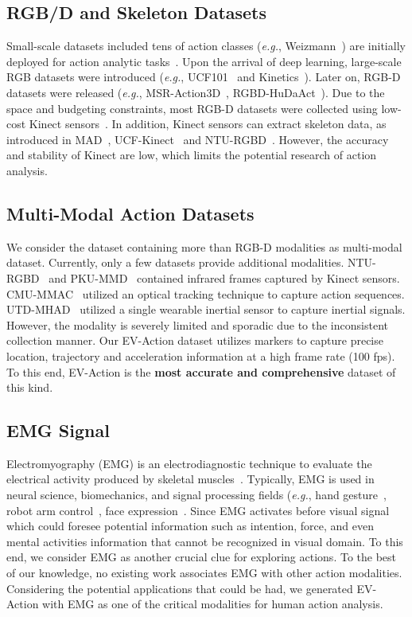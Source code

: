 \documentclass[a4paper, 10pt, conference]{ieeeconf}      \usepackage{FG2020}
\newcommand*\eg{\textit{e.g.}}
\begin{document}
\subsection{RGB/D and Skeleton Datasets}
Small-scale datasets included tens of action classes (\eg, Weizmann~\cite{weiz_dataset}) are initially deployed for  action analytic tasks~\cite{RGBD_Survey}. Upon the arrival of deep learning, large-scale RGB datasets were introduced (\eg, UCF101~\cite{RGB_UCF101} and Kinetics~\cite{RGB_kinetics}). Later on, RGB-D datasets were released (\eg, MSR-Action3D~\cite{MSRAction3D}, RGBD-HuDaAct~\cite{RGBD_data2}). Due to the space and budgeting constraints, most RGB-D datasets were collected using low-cost Kinect sensors~\cite{kinect_v1v2,kinect_book}. In addition, Kinect sensors can extract skeleton data, as introduced in MAD~\cite{MAD1}, UCF-Kinect~\cite{SK_data_UCF} and NTU-RGBD~\cite{SK_data_UTN}. However, the accuracy and stability of Kinect are low, which limits the potential research of action analysis.

\subsection{Multi-Modal Action Datasets}
We consider the dataset containing more than RGB-D modalities as multi-modal dataset. Currently, only a few datasets provide additional modalities. NTU-RGBD~\cite{SK_data_UTN} and PKU-MMD~\cite{PKU_MMD} contained infrared frames captured by Kinect sensors. CMU-MMAC~\cite{Multi_data_CMU} utilized an optical tracking technique to capture action sequences. UTD-MHAD~\cite{Multi_data_UT} utilized a single wearable inertial sensor to capture inertial signals. However, the modality is severely limited and sporadic due to the inconsistent collection manner. Our EV-Action dataset utilizes  markers to capture precise location, trajectory and acceleration information at a high frame rate (100 fps). To this end, EV-Action is the \textbf{most accurate and comprehensive} dataset of this kind.

\subsection{EMG Signal}
Electromyography (EMG) is an electrodiagnostic technique to evaluate the electrical activity produced by skeletal muscles~\cite{EMG_ReBio1,EMG_intro}. Typically, EMG is used in neural science, biomechanics, and signal processing fields (\eg, hand gesture~\cite{EMG_handGesture}, robot arm control~\cite{EMG_Arm}, face expression~\cite{EMG_face1}. Since EMG activates before visual signal which could foresee potential information such as intention, force, and even mental activities information that cannot be recognized in visual domain. To this end, we consider EMG as another crucial clue for exploring actions. To the best of our knowledge, no existing work associates EMG with other action modalities. Considering the potential applications that could be had, we generated EV-Action with EMG as one of the critical modalities for human action analysis.
\end{document}

